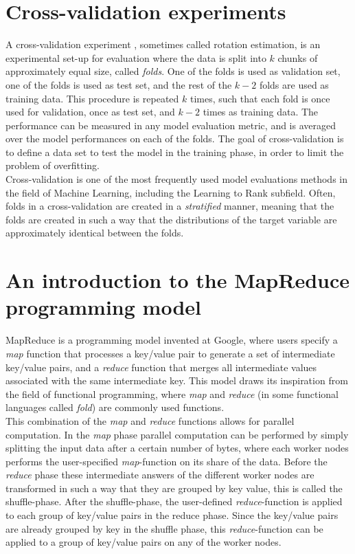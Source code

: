 \section{Cross-validation experiments}
\label{sec:cross_validation}
A cross-validation experiment \cite{kohavi1995}, sometimes called rotation estimation, is an experimental set-up for evaluation where the data is split into $k$ chunks of approximately equal size, called \emph{folds}. One of the folds is used as validation set, one of the folds is used as test set, and the rest of the $k - 2$ folds are used as training data. This procedure is repeated $k$ times, such that each fold is once used for validation, once as test set, and $k - 2$ times as training data. The performance can be measured in any model evaluation metric, and is averaged over the model performances on each of the folds. The goal of cross-validation is to define a data set to test the model in the training phase, in order to limit the problem of overfitting.\\

Cross-validation is one of the most frequently used model evaluations methods in the field of Machine Learning, including the Learning to Rank subfield. Often, folds in a cross-validation are created in a \emph{stratified} manner, meaning that the folds are created in such a way that the distributions of the target variable are approximately identical between the folds.

\section{An introduction to the MapReduce programming model}
MapReduce \cite{Dean2004} is a programming model invented at Google, where users specify a \emph{map} function that processes a key/value pair to generate a set of intermediate key/value pairs, and a \emph{reduce} function that merges all intermediate values associated with the same intermediate key. This model draws its inspiration from the field of functional programming, where \emph{map} and \emph{reduce} (in some functional languages called \emph{fold}) are commonly used functions.\\

This combination of the \emph{map} and \emph{reduce} functions allows for parallel computation. In the \emph{map} phase parallel computation can be performed by simply splitting the input data after a certain number of bytes, where each worker nodes performs the user-specified \emph{map}-function on its share of the data. Before the \emph{reduce} phase these intermediate answers of the different worker nodes are transformed in such a way that they are grouped by key value, this is called the shuffle-phase. After the shuffle-phase, the user-defined \emph{reduce}-function is applied to each group of key/value pairs in the reduce phase. Since the key/value pairs are already grouped by key in the shuffle phase, this \emph{reduce}-function can be applied to a group of key/value pairs on any of the worker nodes.\\